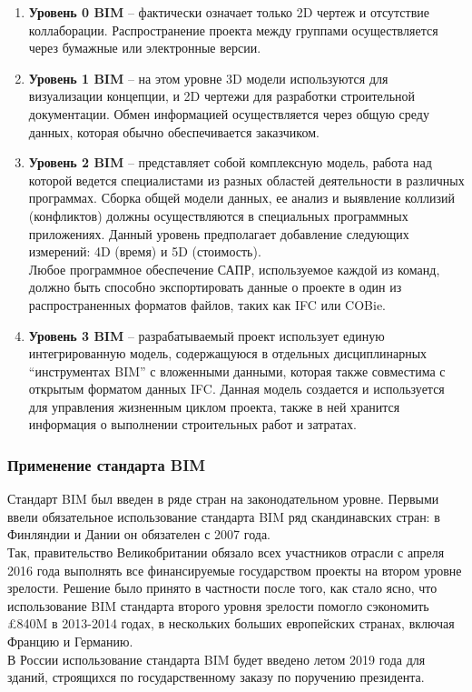 \documentclass[a4paper,14pt]{extreport} %
\begin{document}
\begin{enumerate}
\item \textbf{Уровень 0 BIM} -- фактически означает только 2D чертеж и отсутствие коллаборации. Распространение проекта между группами осуществляется через бумажные или электронные версии.
\item \textbf{Уровень 1 BIM} -- на этом уровне 3D модели используются для визуализации концепции, и 2D чертежи для разработки строительной документации. Обмен информацией осуществляется через общую среду данных, которая обычно обеспечивается заказчиком.
\item \textbf{Уровень 2 BIM} -- представляет собой комплексную модель, работа над которой ведется специалистами из разных областей деятельности в различных программах. Сборка общей модели данных, ее анализ и выявление коллизий (конфликтов) должны осуществляются в специальных программных приложениях. Данный уровень предполагает добавление следующих измерений: 4D (время) и 5D (стоимость). \\
Любое программное обеспечение САПР, используемое каждой из команд, должно быть способно экспортировать данные о проекте в один из распространенных форматов файлов, таких как IFC или COBie.
\item \textbf{Уровень 3 BIM} -- разрабатываемый проект использует единую интегрированную модель, содержащуюся в отдельных дисциплинарных “инструментах BIM” с вложенными данными, которая также совместима с открытым форматом данных IFC. Данная модель создается и используется для управления жизненным циклом проекта, также в ней хранится информация о выполнении строительных работ и затратах.
\end{enumerate}

\newpage
\subsubsection{Применение стандарта BIM}

Стандарт BIM был введен в ряде стран на законодательном уровне\cite{BIM_USAGE}.
Первыми ввели обязательное использование стандарта BIM ряд скандинавских стран: в Финляндии и Дании он обязателен с 2007 года. \\
Так, правительство Великобритании обязало всех участников отрасли с апреля 2016 года выполнять все финансируемые государством проекты на втором уровне зрелости\cite{BIM_UK}. Решение было принято в частности после того, как стало ясно, что использование BIM стандарта второго уровня зрелости помогло сэкономить £840M в 2013-2014 годах, в нескольких больших европейских странах, включая Францию и Германию. \\
В России использование стандарта BIM будет введено летом 2019 года для зданий, строящихся по государственному заказу по поручению президента\cite{BIM_RUSSIA}.
\end{document}
